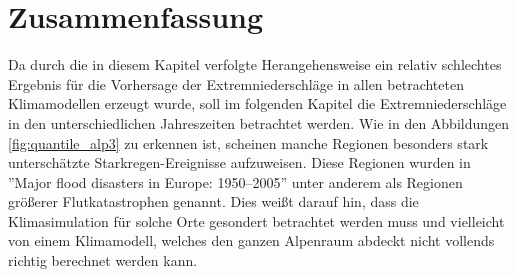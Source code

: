 \section{Zusammenfassung}
Da durch die in diesem Kapitel verfolgte Herangehensweise ein relativ schlechtes Ergebnis für die Vorhersage der Extremniederschläge in allen betrachteten Klimamodellen erzeugt wurde, soll im folgenden Kapitel die Extremniederschläge in den unterschiedlichen Jahreszeiten betrachtet werden. Wie in den Abbildungen \ref{fig:quantile_alp3} zu erkennen ist, scheinen manche Regionen besonders stark unterschätzte Starkregen-Ereignisse aufzuweisen. Diese Regionen wurden in ''Major flood disasters in Europe: 1950–2005'' \cite{barredo_major_2007} unter anderem als Regionen größerer Flutkatastrophen genannt. Dies weißt darauf hin, dass die Klimasimulation für solche Orte gesondert betrachtet werden muss und vielleicht von einem Klimamodell, welches den ganzen Alpenraum abdeckt nicht vollends richtig berechnet werden kann. 